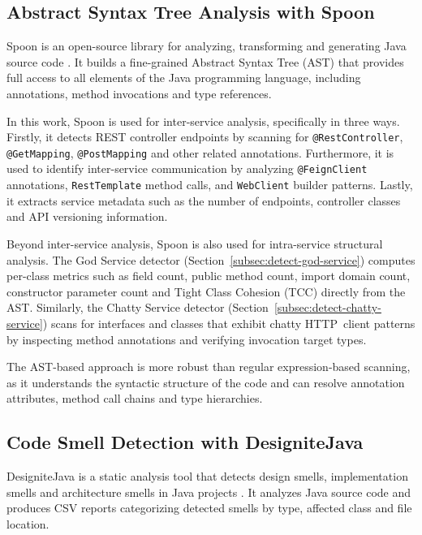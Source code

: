 \subsection{Abstract Syntax Tree Analysis with Spoon}
\label{subsec:spoon-analysis}

\par Spoon is an open-source library for analyzing, transforming and generating Java source code \cite{Pawlak2016}. It builds a fine-grained Abstract Syntax Tree (AST) that provides full access to all elements of the Java programming language, including annotations, method invocations and type references.

In this work, Spoon is used for inter-service analysis, specifically in three ways. Firstly, it detects REST controller endpoints by scanning for \texttt{@RestController}, \texttt{@GetMapping}, \texttt{@PostMapping} and other related annotations. Furthermore, it is used to identify inter-service communication by analyzing \texttt{@FeignClient} annotations, \texttt{RestTemplate} method calls, and \texttt{WebClient} builder patterns. Lastly, it extracts service metadata such as the number of endpoints, controller classes and API versioning information.

Beyond inter-service analysis, Spoon is also used for intra-service structural analysis. The God Service detector (Section~\ref{subsec:detect-god-service}) computes per-class metrics such as field count, public method count, import domain count, constructor parameter count and Tight Class Cohesion (TCC) directly from the AST. Similarly, the Chatty Service detector (Section~\ref{subsec:detect-chatty-service}) scans for interfaces and classes that exhibit chatty HTTP~client patterns by inspecting method annotations and verifying invocation target types.

The AST-based approach is more robust than regular expression-based scanning, as it understands the syntactic structure of the code and can resolve annotation attributes, method call chains and type hierarchies.

\subsection{Code Smell Detection with DesigniteJava}
\label{subsec:designite-analysis}

\par DesigniteJava is a static analysis tool that detects design smells, implementation smells and architecture smells in Java projects \cite{Sharma2018}. It analyzes Java source code and produces CSV reports categorizing detected smells by type, affected class and file location.

